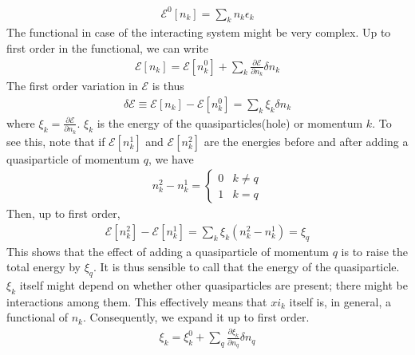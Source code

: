 \documentclass[twoside]{report}
\numberwithin{equation}{section}
\begin{document}
\begin{equation}\begin{aligned}
\mathcal{E}^0[n_k] = \sum_k n_k \epsilon_k
\end{aligned}\end{equation}
The functional in case of the interacting system might be very complex.
Up to first order in the functional, we can write
\begin{equation}\begin{aligned}
	\mathcal{E}[n_k] = \mathcal{E}[n^0_k] + \sum_k \frac{\partial{\mathcal{E}}}{\partial{n_k}}\delta n_k
\end{aligned}\end{equation}
The first order variation in \(\mathcal{E}\) is thus
\begin{equation}\begin{aligned}
	\label{tote}
\delta \mathcal{E} \equiv \mathcal{E}[n_k] -\mathcal{E}[n^0_k] = \sum_k \xi_k \delta n_k
\end{aligned}\end{equation}
where \(\xi_k = \frac{\partial{\mathcal{E}}}{\partial{n_k}}\).
\(\xi_k\) is the energy of the quasiparticles(hole) or momentum \(k\).
To see this, note that if \(\mathcal{E}[n_k^1]\) and \(\mathcal{E}[n_k^2]\) are the energies before and after adding a quasiparticle of momentum \(q\), we have
\begin{equation}\begin{aligned}
n_k^2 - n_k^1 = \begin{cases} 0 & k \neq q\\ 1 & k = q \end{cases}
\end{aligned}\end{equation}
Then, up to first order,
\begin{equation}\begin{aligned}
	\mathcal{E}[n_k^2] - \mathcal{E}[n_k^1] = \sum_k \xi_k \left(n^2_k - n^1_k\right) = \xi_q
\end{aligned}\end{equation}
This shows that the effect of adding a quasiparticle of momentum \(q\) is to raise the total energy by \(\xi_q\).
It is thus sensible to call that the energy of the quasiparticle.
\(\xi_k\) itself might depend on whether other quasiparticles are present; there might be interactions among them.
This effectively means that \(xi_k\) itself is, in general, a functional of \(n_k\).
Consequently, we expand it up to first order.
\begin{equation}\begin{aligned}
	\label{quasienergy}
	\xi_k = \xi_k^0 + \sum_q \frac{\partial{\xi_k}}{\partial{n_q}} \delta n_q
\end{aligned}\end{equation}
\end{document}
